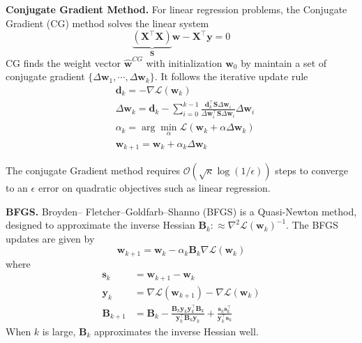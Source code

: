 \documentclass[11pt]{article}
\theoremstyle{plain}
\theoremstyle{definition}
\theoremstyle{remark}
\renewcommand{\^}[1]{^{(#1)}}
\newcommand{\bB}{\boldsymbol{B}}
\newcommand{\bd}{\boldsymbol{d}}
\newcommand{\bX}{\boldsymbol{X}}
\newcommand{\by}{\boldsymbol{y}}
\newcommand{\bS}{\boldsymbol{S}}
\newcommand{\bw}{\boldsymbol{w}}
\newcommand{\bs}{\boldsymbol{s}}
\renewcommand{\paragraph}[1]{\vspace{1mm}\noindent\textbf{#1}}
\begin{document}
\paragraph{Conjugate Gradient Method. } For linear regression problems, the Conjugate Gradient (CG) method solves the linear system
$$
\underbrace{(\bX^\top \bX)}_{\bS} \bw - \bX^\top \by = 0
$$
CG finds the weight vector $\hat{\bw}^{CG}$ with initialization $\bw_0$ by maintain a set of conjugate gradient $\{\Delta \bw_1, \cdots, \Delta \bw_k\}$. It follows the iterative update rule
\begin{equation}
    \begin{aligned}
        & \bd_k = - \nabla \mathcal L(\bw_k) \\
        & \Delta \bw_k = \bd_k - \sum_{i=0}^{k-1} \frac{\bd_k^\top \bS \Delta \bw_i}{\Delta \bw_i^\top \bS \Delta \bw_i} \Delta \bw_i \\
        & \alpha_k = \arg \min_{\alpha} \mathcal L(\bw_k + \alpha \Delta \bw_k) \\
        &\bw_{k+1} = \bw_k + \alpha_k \Delta \bw_k
    \end{aligned}
\end{equation}

The conjugate Gradient method requires $\mathcal O\left(\sqrt{\kappa} \log(1/\epsilon)\right)$ steps to converge to an $\epsilon$ error on quadratic objectives such as linear regression. 

\paragraph{BFGS. } Broyden– Fletcher–Goldfarb–Shanno (BFGS) is a Quasi-Newton method, designed to approximate the inverse Hessian $\bB_k :\approx \nabla^2 \mathcal L(\bw_k)^{-1}$. The BFGS updates are given by
\begin{equation}
    \bw_{k+1} = \bw_k - \alpha_k \bB_k \nabla \mathcal L(\bw_k)
\end{equation}
where 
\begin{equation*}
    \begin{aligned}
    \bs_k &= \bw_{k+1} - \bw_k \\
    \by_k &= \nabla \mathcal L(\bw_{k+1}) - \nabla \mathcal L(\bw_{k}) \\
    \bB_{k+1} &= \bB_k - \frac{\bB_k \by_k \by_k^\top \bB_k}{\by_k^\top \bB_k \by_k} + \frac{\bs_k \bs_k^\top}{\by_k^\top \bs_k}
    \end{aligned}
\end{equation*}
When $k$ is large, $\bB_k$ approximates the inverse Hessian well.
\end{document}
